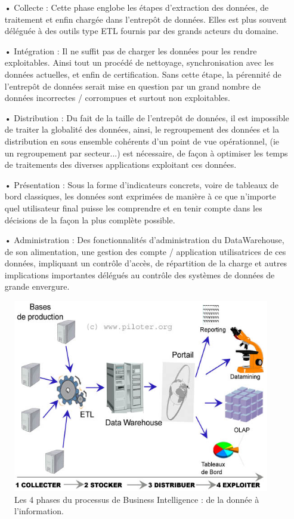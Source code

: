 \begin{itemize}
\item[•]Collecte : Cette phase englobe les étapes d'extraction des données, de traitement et enfin chargée dans l'entrepôt de données. Elles est plus souvent déléguée à des outils type ETL fournis par des grands acteurs du domaine.
\item[•]Intégration : Il ne suffit pas de charger les données pour les rendre exploitables. Ainsi tout un procédé de nettoyage, synchronisation avec les données actuelles, et enfin de certification. Sans cette étape, la pérennité de l'entrepôt de données serait mise en question par un grand nombre de données incorrectes / corrompues et surtout non exploitables.
\item[•]Distribution : Du fait de la taille de l'entrepôt de données, il est impossible de traiter la globalité des données, ainsi, le regroupement des données et la distribution en sous ensemble cohérents d’un point de vue opérationnel, (ie un regroupement par secteur...)  est nécessaire, de façon à optimiser les temps de traitements des diverses applications exploitant ces données.
\item[•]Présentation : Sous la forme d’indicateurs concrets, voire de tableaux de bord classiques, les données sont exprimées de manière à ce que n’importe quel utilisateur final puisse les comprendre et en tenir compte dans les décisions de la façon la plus complète possible.
\item[•]Administration :  Des fonctionnalités d’administration du DataWarehouse, de son alimentation, une gestion des compte / application utilisatrices de ces données, impliquant un contrôle d’accès, de répartition de la charge et autres implications importantes délégués au contrôle des systèmes de données de grande envergure.
\end{itemize}

\begin{figure}[H]
\begin{center}
  \includegraphics[scale= 0.5]{Enjeu.jpg}
  \caption{Les 4 phases du processus de Business Intelligence : de la donnée à l'information.}
\end{center}  
\end{figure}

